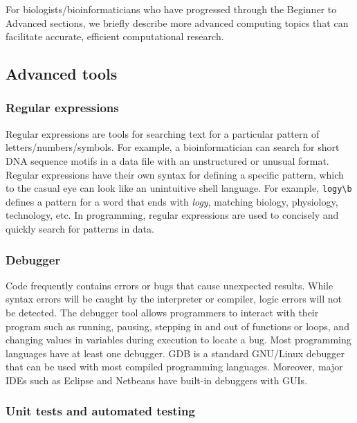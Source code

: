 \documentclass[ChapterTOCs,krantz2]{krantz} %
\begin{document}
For biologists/bioinformaticians who have progressed through the Beginner
to Advanced sections, we briefly describe more advanced computing topics 
that can facilitate accurate, efficient computational research.

\subsection{Advanced tools}


\subsubsection{Regular expressions}

Regular expressions are tools for
searching text for a particular pattern of letters/numbers/symbols.  For
example, a bioinformatician can search for short DNA sequence motifs in 
a data file with an unstructured or unusual format.  Regular expressions have their own
syntax for defining a specific pattern, which to the casual eye can look like
an unintuitive shell language. For example, \texttt{logy\textbackslash{}b} defines a pattern for a word
that ends with \emph{logy}, matching biology, physiology, technology, etc.
In programming, regular expressions are
used to concisely and quickly search for patterns in data.

\subsubsection{Debugger}

Code frequently contains errors or bugs that cause unexpected results.
While syntax errors will be caught by the interpreter or compiler, 
logic errors will not be detected.
The debugger tool allows programmers to interact with their program such as
running, pausing, stepping in and out of functions or loops, and changing values
in variables during execution to locate a bug.
Most programming languages have at least one debugger.
GDB is a standard GNU/Linux debugger that can be used with most
compiled programming languages.
Moreover, major IDEs such as Eclipse and Netbeans have built-in debuggers
with GUIs. 

\subsubsection{Unit tests and automated testing}
\end{document}
